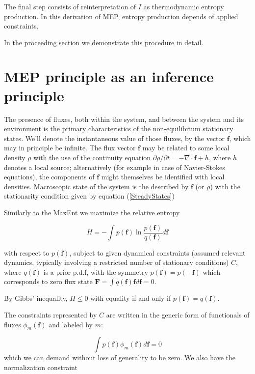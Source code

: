 \documentclass[a4paper,12pt]{article}
\begin{document}
The final step consists of reinterpretation of $I$ as thermodynamic entropy production. %
In this derivation of MEP, entropy production depends of applied constraints.

In the proceeding section we demonstrate this procedure in detail.



\section{MEP principle as an inference principle}

The presence of fluxes, both within the system, and between the system and its environment is the primary characteristics of the non-equilibrium stationary states. We'll denote the instantaneous value of those fluxes, by the vector $\bm{f}$, which may in principle be infinite. The flux vector $\bm{f}$ may be related to some local density $\rho$ with the use of the continuity equation $\partial \rho / \partial t =  - \nabla \cdot \bm{f} + h$, where $h$ denotes a local source; alternatively (for example in case of Navier-Stokes equations), the components of $\bm{f}$ might themselves be identified with local densities. Macroscopic state of the system is the described by $\bm{f}$ (or $\rho$) with the stationarity condition given by equation (\ref{SteadyStates})

Similarly to the MaxEnt we maximize the relative entropy

\begin{equation}
  H = - \int p(\bm{f})\ln \frac{p(\bm{f})}{q(\bm{f})} d\bm{f}
\end{equation}

with respect to $p(\bm{f})$, subject to given dynamical constraints (assumed relevant dynamics, typically involving a restricted number of stationary conditions) $C$, where $q(\bm{f})$ is a prior p.d.f, with the symmetry $p(\bm{f}) =p(\bm{-f})$ which corresponds to zero flux state $\bm{F}= \int q(\bm{f}) \bm{f} d\bm{f}=0 $.

By Gibbs' inequality, $H \leq 0$ with equality if and only if $p(\bm{f})=q(\bm{f})$.


The constraints represented by $C$ are written in the generic form of functionals of fluxes $\phi_m(\bm{f})$ and labeled by $m$:

\begin{equation}
\label{Constrain1MEP}
  \int p(\bm{f})\phi_m(\bm{f})d\bm{f} =0
\end{equation}
which we can demand without loss of generality to be zero.
We also have the normalization constraint
\end{document}
